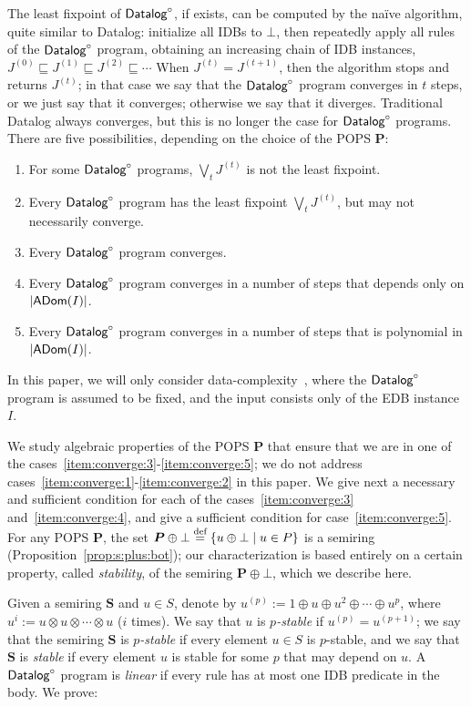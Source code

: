 The least fixpoint of $\text{\sf Datalog}^\circ$, if exists, can be computed by the na\"ive
algorithm, quite similar to Datalog: initialize all IDBs to $\bot$,
then repeatedly apply all rules of the $\text{\sf Datalog}^\circ$ program, obtaining an
increasing chain of IDB instances,
$J^{(0)} \sqsubseteq J^{(1)} \sqsubseteq J^{(2)} \sqsubseteq \cdots$
When $J^{(t)} = J^{(t+1)}$, then the algorithm stops and returns
$J^{(t)}$; in that case we say that the $\text{\sf Datalog}^\circ$ program converges in
$t$ steps, or we just say that it converges; otherwise we say that it
diverges.  Traditional Datalog always converges, but this is no longer
the case for $\text{\sf Datalog}^\circ$ programs.  There are five possibilities,
depending on the choice of the POPS $\bm P$:
%
\begin{enumerate}[label=(\roman*)]
\item \label{item:converge:1} For some $\text{\sf Datalog}^\circ$ programs, $\bigvee_t J^{(t)}$ is not the least fixpoint.
\item \label{item:converge:2} Every $\text{\sf Datalog}^\circ$ program has the least fixpoint $\bigvee_t J^{(t)}$, but may not necessarily converge.
\item \label{item:converge:3} Every $\text{\sf Datalog}^\circ$ program converges.
\item \label{item:converge:4} Every $\text{\sf Datalog}^\circ$ program converges in a
  number of steps that depends only on $|\textsf{ADom}(I)|$.
\item \label{item:converge:5} Every $\text{\sf Datalog}^\circ$ program converges in a
  number of steps that is polynomial in $|\textsf{ADom}(I)|$.
\end{enumerate}
%
In this paper, we will only consider
data-complexity~\cite{DBLP:conf/stoc/Vardi82}, where the $\text{\sf Datalog}^\circ$
program is assumed to be fixed, and the input consists only of the EDB
instance $I$.

We study algebraic properties of the POPS $\bm P$ that ensure that we
are in one of the cases~\ref{item:converge:3}-\ref{item:converge:5};
we do not address cases~\ref{item:converge:1}-\ref{item:converge:2} in
this paper.  We give next a necessary and sufficient condition for
each of the cases~\ref{item:converge:3} and~\ref{item:converge:4}, and
give a sufficient condition for case~\ref{item:converge:5}.  For any
POPS $\bm P$, the set
$\bm P \oplus \bot \stackrel{\text{def}}{=} \{{u\oplus \bot}\mid{u \in P}\}$ is a
semiring (Proposition~\ref{prop:s:plus:bot}); our characterization is based entirely on a certain
property, called {\em stability}, of the semiring $\bm P \oplus \bot$,
which we describe here.

Given a semiring $\bm S$ and $u \in S$, denote by
$u^{(p)} := 1 \oplus u \oplus u^2 \oplus \cdots \oplus u^{p}$, where
$u^{i} := u \otimes u \otimes \cdots \otimes u$ ($i$ times).  We say
that $u$ is {\em $p$-stable} if $u^{(p)}=u^{(p+1)}$; we say that the
semiring $\bm S$ is {\em $p$-stable} if every element $u \in S$ is $p$-stable, and
we say that $\bm S$ is {\em stable} if every element $u$ is stable for some
$p$ that may depend on $u$.
A $\text{\sf Datalog}^\circ$ program is {\em linear} if every rule has at most one IDB predicate in the body.
We prove:

